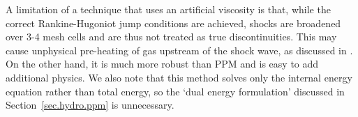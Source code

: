 A limitation of a technique that uses an artificial viscosity is that, while the correct Rankine-Hugoniot jump conditions are achieved, shocks are broadened over 3-4 mesh cells and are thus not treated as true discontinuities. This may cause unphysical pre-heating of gas upstream of the shock wave, as discussed in \citet{1994ApJ...429..434A}.  On the other hand, it is much more robust than PPM and is easy to add additional physics.  We also note that this method solves only the internal energy equation rather than total energy, so the `dual energy formulation' discussed in Section~\ref{sec.hydro.ppm} is unnecessary.
